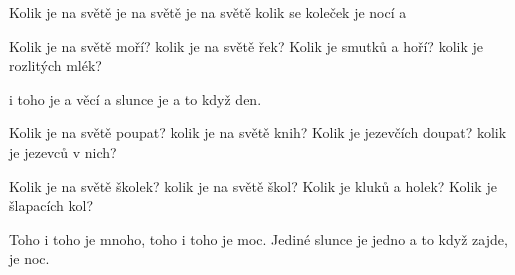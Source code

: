 \begin{TEXT}{Kolik je na světě}
\SLOKA {} je na světě  
 je na světě 
kolik se koleček 
 je nocí a 

\SLOKA Kolik je na světě moří?
kolik je na světě řek?
Kolik je smutků a hoří?
kolik je rozlitých mlék?

\REFREN {} i toho je 
 a věcí a 
 slunce je 
a to když   den.

\SLOKA Kolik je na světě poupat?
kolik je na světě knih?
Kolik je jezevčích doupat?
kolik je jezevců v nich?

\SLOKA Kolik je na světě školek?
kolik je na světě škol?
Kolik je kluků a holek?
Kolik je šlapacích kol?

\REFREN Toho i toho je mnoho,
toho i toho je moc.
Jediné slunce je jedno
a to když zajde, je noc.
\end{TEXT}